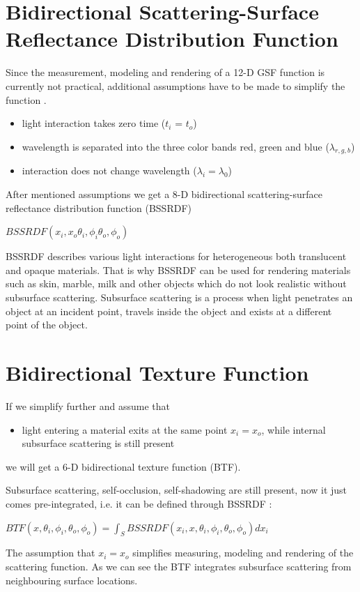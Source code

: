 \section{Bidirectional Scattering-Surface Reflectance Distribution Function}
\label{section:BSSRDF}
 Since the measurement, modeling and rendering of a 12-D GSF function is currently not practical, additional assumptions have to be made to simplify the function \cite{star2004}.


\begin{itemize}
 \item light interaction takes zero time ($t_{i}$  = $t_{o}$)
 \item wavelength is separated into the three color bands red, green and blue ($\lambda_{r,g,b}$)
 \item interaction does not change wavelength ($\lambda_{i}= \lambda_{0}$)
\end{itemize}

After mentioned assumptions we get a 8-D bidirectional scattering-surface reflectance distribution function (BSSRDF)
 \begin{center}
$BSSRDF(x_{i},x_{o}\theta_{i} ,\phi_{i}\theta_{o} ,\phi_{o})$
 \end{center}


BSSRDF describes various light interactions for heterogeneous both translucent and opaque materials.
That is why BSSRDF can be used for rendering materials such as skin, marble, milk and other objects which do not look realistic without subsurface scattering. 
Subsurface scattering is a process when light penetrates an object at an incident point, travels inside the object and exists at a different point of the object.

\section{Bidirectional Texture Function}
\label{section:btf}
If we simplify further and assume that

\begin{itemize}
 \item light entering a material exits at the same point $x_{i}=x_{o}$, while internal subsurface scattering is still present
\end{itemize}

we will get a 6-D bidirectional texture function (BTF).

Subsurface scattering, self-occlusion, self-shadowing  are still present, now it just comes pre-integrated, i.e. it can be defined through BSSRDF \cite{star2004}:
 \begin{center}
$ BTF(x,\theta_{i} ,\phi_{i},\theta_{o} ,\phi_{o})=\int_{S}BSSRDF(x_{i},x,\theta_{i} ,\phi_{i},\theta_{o} ,\phi_{o}) dx_{i}$
 \end{center}
  The assumption that $x_{i}=x_{o}$ simplifies measuring, modeling and rendering of the scattering function. 
 As we can see the BTF integrates subsurface scattering from neighbouring surface locations. 

